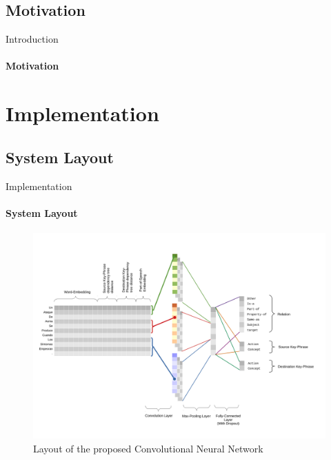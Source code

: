 \documentclass{beamer}
\begin{document}
\subsection{Motivation}
\begin{frame}{Introduction}
	\framesubtitle{Motivation}

\end{frame}



%
%

\section{Implementation}



\subsection{System Layout}

\begin{frame}{Implementation}
	\framesubtitle{System Layout}
    \begin{figure}[ht]
    \centering
    \includegraphics[width=0.9\linewidth,trim={0 1.7cm 0 2.2cm},clip]{diagramtass18.pdf}
    \caption{Layout of the proposed Convolutional Neural Network}
    \label{fig:architecture}
\end{figure}
\end{frame}




%
%
\end{document}
